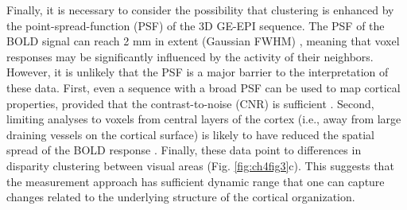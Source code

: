 Finally, it is necessary to consider the possibility that clustering is enhanced by the point-spread-function (PSF) of the 3D GE-EPI sequence. The PSF of the BOLD signal can reach 2 mm in extent (Gaussian FWHM) \cite{Shmuel:2007hs}, meaning that voxel responses may be significantly influenced by the activity of their neighbors. However, it is unlikely that the PSF is a major barrier to the interpretation of these data. First, even a sequence with a broad PSF can be used to map cortical properties, provided that the contrast-to-noise (CNR) is sufficient \cite{Yacoub:2008hr}. Second, limiting analyses to voxels from central layers of the cortex (i.e., away from large draining vessels on the cortical surface) is likely to have reduced the spatial spread of the BOLD response \cite{Polimeni:2010fl}. Finally, these data point to differences in disparity clustering between visual areas (Fig. \ref{fig:ch4fig3}c). This suggests that the measurement approach has sufficient dynamic range that one can capture changes related to the underlying structure of the cortical organization.

